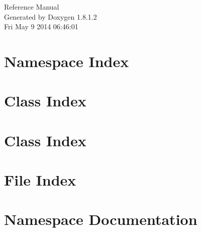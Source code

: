 \documentclass{article}
\begin{document}
\hypersetup{pageanchor=false,citecolor=blue}
\begin{titlepage}
\vspace*{7cm}
\begin{center}
{\Large Reference Manual}\\
\vspace*{1cm}
{\large Generated by Doxygen 1.8.1.2}\\
\vspace*{0.5cm}
{\small Fri May 9 2014 06:46:01}\\
\end{center}
\end{titlepage}
\tableofcontents
{}
\hypersetup{pageanchor=true,citecolor=blue}
\section{Namespace Index}

\section{Class Index}

\section{Class Index}

\section{File Index}

\section{Namespace Documentation}






\end{document}
